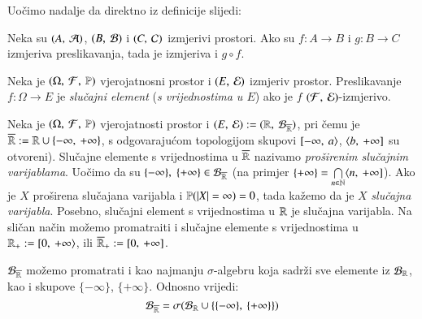 Uo\v cimo nadalje da direktno iz definicije slijedi:

\begin{lm}  \label{lm:3.6}
    Neka su $(A, \: \mathcal{A})$, $(B, \: \mathcal{B})$ i $(C, \: \mathcal{C})$ izmjerivi prostori. Ako su $f: A \to B$ i $g:B \to C$ izmjeriva preslikavanja, tada je izmjeriva i $g \circ f$.
\end{lm}

\begin{defn}    \label{defn:3.7}
    Neka je $(\Omega, \: \mathcal{F}, \: \mathbb{P})$ vjerojatnosni prostor i $(E, \: \mathcal{E})$ izmjeriv prostor. Preslikavanje $f: \Omega \to E$ je \emph{slu\v cajni element} (\emph{s vrijednostima u $E$}) ako je $f$
    $(\mathcal{F}, \: \mathcal{E})$-izmjerivo.
\end{defn}

\begin{pr}  \label{pr:3.8}
    Neka je $(\Omega, \: \mathcal{F}, \: \mathbb{P})$ vjerojatnosti prostor i $(E, \: \mathcal{E}) := (\mathbb{R}, \: \mathcal{B}_{\overline{\mathbb{R}}})$, pri \v cemu je $\overline{\mathbb{R}} := \mathbb{R} \cup \{-\infty, \: +\infty\}$, s odgovaraju\' com topologijom skupovi $[ {-\infty}, \: {a} \rangle$, $\langle {b}, \: {+\infty}]$ su otvoreni).
    Slu\v cajne elemente s vrijednostima u $\overline{\mathbb{R}}$ nazivamo \emph{pro\v sirenim slu\v cajnim varijablama}.
    Uo\v cimo da su $\{ -\infty \}, \; \{+\infty\} \in \mathcal{B}_{\overline{\mathbb{R}}}$ (na primjer $\{+\infty\} = \bigcap\limits_{n \in \mathbb{N}}^{} \langle {n}, \: {+\infty}]$).
    Ako je $X$ pro\v sirena slu\v cajana varijabla i $\mathbb{P}({|X| = \infty}) = 0$, tada ka\v zemo da je $X$ \emph{slu\v cajna varijabla}.
    Posebno, slu\v cajni element s vrijednostima u $\mathbb{R}$ je slu\v cajna varijabla.
    Na sli\v can na\v cin mo\v zemo promatraiti i slu\v cajne elemente s vrijednostima u $\mathbb{R}_+ := [ {0}, \: {+\infty} \rangle$, ili $\overline{\mathbb{R}}_+ := [{0}, \:{+\infty}]$. 
\end{pr}

\begin{nap} \label{nap:3.8.1}
    $\mathcal{B}_{\overline{\mathbb{R}}}$ mo\v zemo promatrati i kao najmanju $\sigma$-algebru koja sadr\v zi sve elemente iz $\mathcal{B}_{\mathbb{R}}$, kao i skupove $\{-\infty\}$, $\{+\infty\}$.
    Odnosno vrijedi:
    \begin{equation*}
        \mathcal{B}_{\overline{\mathbb{R}}} = \sigma({\mathcal{B}_{\mathbb{R}} \cup \{\{-\infty\}, \: \{+\infty\}\}})
    \end{equation*}
\end{nap}


